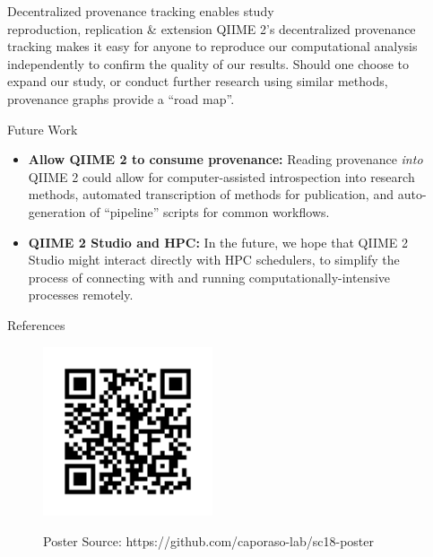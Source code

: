 \documentclass[final]{beamer}
\newlength{\sepwidth}
\newlength{\colwidth}
\newcommand{\separatorcolumn}{\begin{column}{\sepwidth}\end{column}}
\begin{document}
\begin{frame}[t]
\begin{columns}[t]
\begin{column}{\colwidth}
\begin{block}{Decentralized provenance tracking enables study \\ reproduction, replication \& extension}
    QIIME 2’s decentralized provenance tracking makes it easy for anyone to reproduce our
    computational analysis independently to confirm the quality of our results.
    Should one choose to expand our study, or conduct further research using
    similar methods, provenance graphs provide a “road map”.

  \end{block}

  \begin{block}{Future Work}

    \begin{itemize}
      \item \textbf{Allow QIIME 2 to consume provenance:} Reading
      provenance \textit{into} QIIME 2 could allow for computer-assisted
      introspection into research methods, automated transcription of methods
      for publication, and auto-generation of “pipeline” scripts for common workflows.
      \item \textbf{QIIME 2 Studio and HPC:} In the future, we hope that QIIME 2 Studio might interact
      directly with HPC schedulers, to simplify the process of connecting with
      and running computationally-intensive processes remotely.
    \end{itemize}

  \end{block}

  \begin{block}{References}

    \nocite{*}
    

  \end{block}

  \begin{figure}
    \begin{minipage}[c]{\textwidth}
      \hfill
      \includegraphics[height=5cm]{assets/repo}
    \end{minipage}
    \begin{minipage}[c]{\textwidth}
      \hfill
      Poster Source: https://github.com/caporaso-lab/sc18-poster
    \end{minipage}
\end{figure}


\end{column}

\separatorcolumn
\end{columns}
\end{frame}
\end{document}
